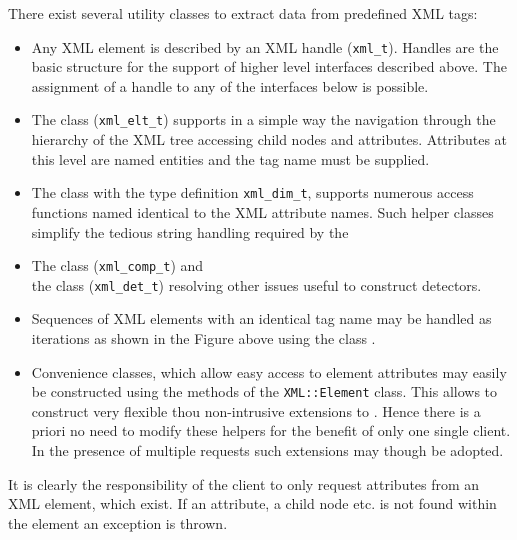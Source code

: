 \documentclass[10pt,a4paper]{article}
\begin{document}
\noindent
There exist several utility classes to extract data from predefined XML tags:
\begin{itemize}\itemcompact
\item Any XML element is described by an XML handle
       ({\tt{xml\_t}}). Handles are the basic structure for the support
       of higher level interfaces described above. The assignment of a handle
       to any of the interfaces below is possible.
\item The class  
       ({\tt{xml\_elt\_t}})
       supports in a simple way the navigation through the hierarchy of the 
       XML tree accessing child nodes and attributes. Attributes at this
       level are named entities and the tag name must be supplied.
\item The class  
       with the type definition {\tt{xml\_dim\_t}}, 
       supports numerous access functions named identical to the
       XML attribute names. Such helper classes simplify the tedious
       string handling required by the 
\item The class  
       ({\tt{xml\_comp\_t}}) and \\
       the class 
       ({\tt{xml\_det\_t}}) resolving other issues useful to construct detectors.
\item Sequences of XML elements with an identical tag name may be handled
       as iterations as shown in the Figure above using the class
       .
\item Convenience classes, which allow easy access to element attributes 
       may easily be constructed using the methods of the {\tt{XML::Element}}
       class. This allows to construct very flexible thou non-intrusive 
       extensions to \DDhep. Hence there is a priori no need to modify
       these helpers for the benefit of only one single client.
       In the presence of multiple requests such extensions may though be adopted.
\end{itemize}
It is clearly the responsibility of the client to only request attributes
from an XML element, which exist. If an attribute, a child node etc. is not 
found within the element an exception is thrown.
\end{document}
